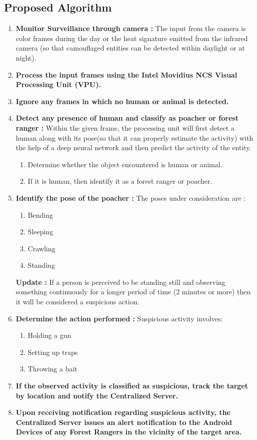 \documentclass[12pt]{extarticle}
\begin{document}
\subsection{Proposed Algorithm }
\begin{enumerate}
	\item \textbf{Monitor Surveillance through camera :}
	\newline The input from the camera is color frames during the day or the heat signature emitted from the infrared camera (so that camouflaged entities can be detected within daylight or at night).
	\item \textbf{Process the input frames using the Intel Movidius NCS Visual Processing Unit (VPU).}
	\item \textbf{Ignore any frames in which no human or animal is detected.}
	\item \textbf{Detect any presence of human and classify as poacher or forest ranger :}
	\newline Within the given frame, the processing unit will first detect a human along with its pose(so that it can properly estimate the activity) with the help of a deep neural network and then predict the activity of the entity.
	\begin{enumerate}
		\item Determine whether the object encountered is human or animal.
		\item If it is human, then identify it as a forest ranger or poacher.
	\end{enumerate}
	\item \textbf{Identify the pose of the poacher :}
	\newline The poses under consideration are :
	\begin{enumerate}
		\item Bending
		\item Sleeping
		\item Crawling
		\item Standing
	\end{enumerate}
	\textbf{Update :}
	If a person is perceived to be standing still and observing something continuously for a longer period of time (2 minutes or more) then it will be considered a suspicious action.
	\item \textbf{Determine the action performed :}
	\newline Suspicious activity involves:
	\begin{enumerate}
		\item Holding a gun
		\item Setting up traps
		\item Throwing a bait
	\end{enumerate}
	\item \textbf{If the observed activity is classified as suspicious, track the target by location and notify the Centralized Server.}
	\item \textbf{Upon receiving notification regarding suspicious activity, the Centralized Server issues an alert notification to the Android Devices of any Forest Rangers in the vicinity of the target area. }
\end{enumerate}
\end{document}
